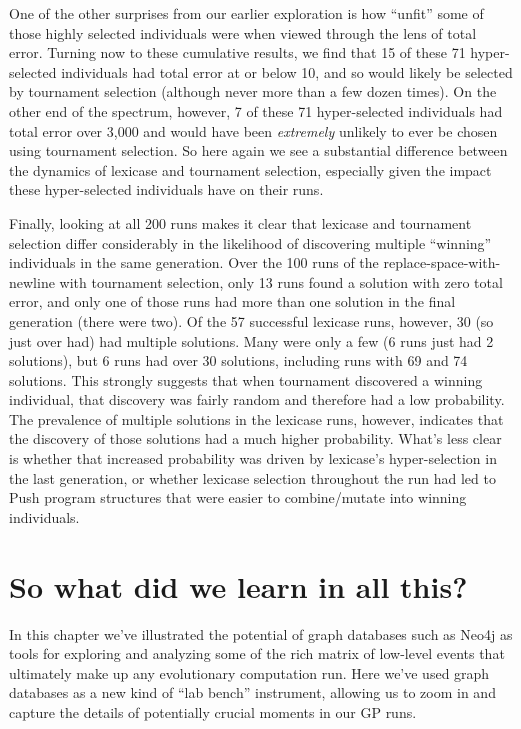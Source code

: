 One of the other surprises from our earlier exploration is how ``unfit'' some of those highly selected individuals were when
viewed through the lens of total error. Turning now to these cumulative results, we find that 15 of these 71 hyper-selected
individuals had total error at or below 10, and so would likely be selected by tournament selection (although never more 
than a few dozen times). On the other end of the spectrum, however, 7 of these 71 hyper-selected individuals had total 
error over 3,000 and would have been \emph{extremely} unlikely to ever be chosen using tournament selection. So here
again we see a substantial difference between the dynamics of lexicase and tournament selection, especially given the
impact these hyper-selected individuals have on their runs.

Finally, looking at all 200 runs makes it clear that lexicase and tournament selection differ considerably in the 
likelihood of discovering multiple ``winning'' individuals in the same generation. Over the 100 runs of the 
replace-space-with-newline with tournament selection, only 13 runs found a solution with zero total error, and only one
of those runs had more than one solution in the final generation (there were two). Of the 57 successful lexicase runs, 
however, 30 (so just over had) had multiple solutions. Many were only a few (6 runs just had 2 solutions), but 6 runs had
over 30 solutions, including runs with 69 and 74 solutions. This strongly suggests that when tournament discovered a
winning individual, that discovery was fairly random and therefore had a low probability. The prevalence of multiple
solutions in the lexicase runs, however, indicates that the discovery of those solutions had a much higher probability.
What's less clear is whether that increased probability was driven by lexicase's hyper-selection in the last generation,
or whether lexicase selection throughout the run had led to Push program structures that were easier to combine/mutate
into winning individuals.

\section{So what did we learn in all this?}
\label{sec:whatDidWeLearn}

In this chapter we've illustrated the potential of graph databases such as Neo4j as tools for exploring 
and analyzing some of the rich matrix of low-level events that ultimately make up any evolutionary
computation run. Here we've used graph databases as a new kind of ``lab bench'' instrument, allowing us to
zoom in and capture the details of potentially crucial moments in our GP runs.


